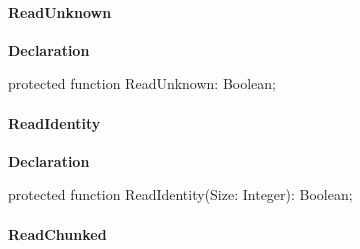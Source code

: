 \documentclass{report}
\newif\ifpdf
\begin{document}
\paragraph*{ReadUnknown}\hspace*{\fill}

\label{httpsend.THTTPSend-ReadUnknown}
\begin{list}{}{
\setlength{\itemindent}{0cm}
\setlength{\listparindent}{0cm}
\setlength{\leftmargin}{\evensidemargin}
\addtolength{\leftmargin}{\tmplength}
\settowidth{\labelsep}{X}
\addtolength{\leftmargin}{\labelsep}
\setlength{\labelwidth}{\tmplength}
}
\item[\textbf{Declaration}\hfill]
\ifpdf
\begin{flushleft}
\fi
\begin{ttfamily}
protected function ReadUnknown: Boolean;\end{ttfamily}

\ifpdf
\end{flushleft}
\fi

\end{list}
\paragraph*{ReadIdentity}\hspace*{\fill}

\label{httpsend.THTTPSend-ReadIdentity}
\begin{list}{}{
\setlength{\itemindent}{0cm}
\setlength{\listparindent}{0cm}
\setlength{\leftmargin}{\evensidemargin}
\addtolength{\leftmargin}{\tmplength}
\settowidth{\labelsep}{X}
\addtolength{\leftmargin}{\labelsep}
\setlength{\labelwidth}{\tmplength}
}
\item[\textbf{Declaration}\hfill]
\ifpdf
\begin{flushleft}
\fi
\begin{ttfamily}
protected function ReadIdentity(Size: Integer): Boolean;\end{ttfamily}

\ifpdf
\end{flushleft}
\fi

\end{list}
\paragraph*{ReadChunked}\hspace*{\fill}
\end{document}
